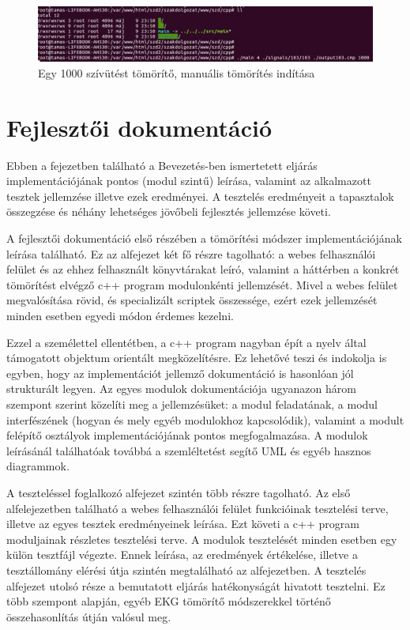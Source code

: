 \documentclass[oneside,titlepage,12pt,a4paper]{report}
\begin{document}
\begin{figure}[H]
\begin{center}
   \includegraphics[width=150mm]{./Abrak/WWW/manualis_tom.jpg}
  \caption{Egy 1000 szívütést tömörítő, manuális tömörítés indítása}
\end{center}
\end{figure}

\chapter{Fejlesztői dokumentáció}

Ebben a fejezetben található a Bevezetés-ben ismertetett eljárás implementációjának pontos (modul szintű) leírása, valamint az alkalmazott tesztek jellemzése illetve ezek eredményei. A tesztelés eredményeit a tapasztalok összegzése és néhány lehetséges jövőbeli fejlesztés jellemzése követi. \par A fejlesztői dokumentáció első részében a tömörítési módszer implementációjának leírása található. Ez az alfejezet két fő részre tagolható: a webes felhasználói felület és az ehhez felhasznált könyvtárakat leíró, valamint a háttérben a konkrét tömörítést elvégző c++ program modulonkénti jellemzését. Mivel a webes felület megvalósítása rövid, és specializált scriptek összessége, ezért ezek jellemzését minden esetben egyedi módon érdemes kezelni. 
\par Ezzel a személettel ellentétben, a c++ program nagyban épít a nyelv által támogatott objektum orientált megközelítésre. Ez lehetővé teszi és indokolja is egyben, hogy az implementációt jellemző dokumentáció is hasonlóan jól strukturált legyen. Az egyes modulok dokumentációja ugyanazon három szempont szerint közelíti meg a jellemzésüket: a modul feladatának, a modul interfészének (hogyan és mely egyéb modulokhoz kapcsolódik), valamint a modult felépítő osztályok implementációjának pontos megfogalmazása. A modulok leírásánál találhatóak továbbá a szemléltetést segítő UML és egyéb hasznos diagrammok. 
\par  A teszteléssel foglalkozó alfejezet szintén több részre tagolható. Az első alfelejezetben található a webes felhasználói felület funkcióinak tesztelési terve, illetve az egyes tesztek eredményeinek leírása. Ezt követi a c++ program moduljainak részletes tesztelési terve. A modulok tesztelését minden esetben egy külön tesztfájl végezte. Ennek leírása, az eredmények értékelése, illetve a tesztállomány elérési útja szintén megtalálható az alfejezetben. A  tesztelés alfejezet utolsó része a bemutatott eljárás hatékonyságát hivatott tesztelni. Ez több szempont alapján, egyéb EKG tömörítő módszerekkel történő összehasonlítás útján valósul meg. 
\end{document}
